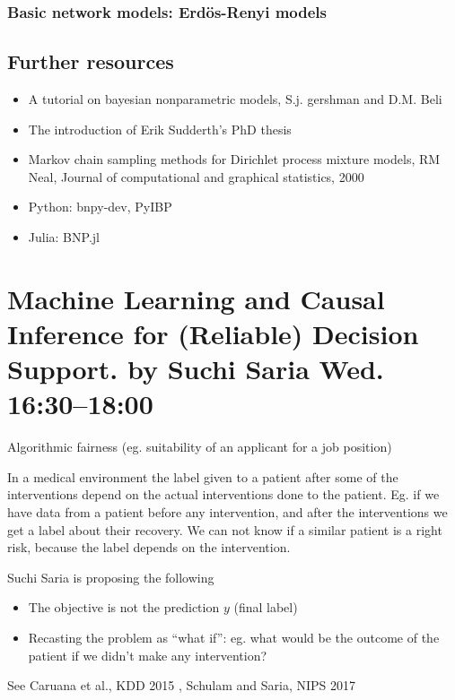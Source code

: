 \documentclass[b5paper]{report}
\begin{document}
\subsection{Basic network models: Erdös-Renyi models}

\section{Further resources}

\begin{itemize}
  \item A tutorial on bayesian nonparametric models, S.j. gershman and D.M.
    Beli
  \item The introduction of Erik Sudderth's PhD thesis
  \item Markov chain sampling methods for Dirichlet process mixture models, RM
    Neal, Journal of computational and graphical statistics, 2000
  \item Python: bnpy-dev, PyIBP
  \item Julia: BNP.jl
\end{itemize}

\chapter{Machine Learning and Causal Inference for (Reliable) Decision Support.
  by Suchi Saria Wed. 16:30--18:00}

Algorithmic fairness (eg. suitability of an applicant for a job position)

In a medical environment the label given to a patient after some of the
interventions depend on the actual interventions done to the patient. Eg. if we
have data from a patient before any intervention, and after the interventions
we get a label about their recovery. We can not know if a similar patient is a
right risk, because the label depends on the intervention.

Suchi Saria is proposing the following

\begin{itemize}
  \item The objective is not the prediction $y$ (final label)
  \item Recasting the problem as ``what if'': eg. what would be the outcome of
    the patient if we didn't make any intervention?
\end{itemize}

See Caruana et al., KDD 2015 \cite{caruana2015intelligible}, Schulam and Saria,
NIPS 2017 \cite{schulam2017reliable}
\end{document}
